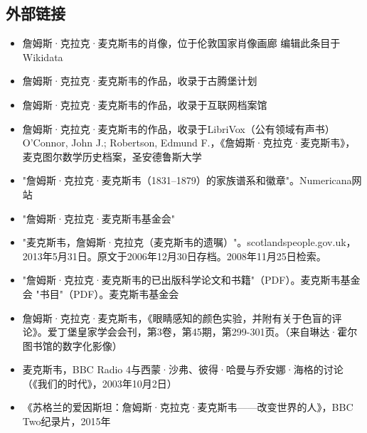 \subsection{外部链接}
\begin{itemize}
\item 詹姆斯·克拉克·麦克斯韦的肖像，位于伦敦国家肖像画廊 编辑此条目于Wikidata  
\item 詹姆斯·克拉克·麦克斯韦的作品，收录于古腾堡计划  
\item 詹姆斯·克拉克·麦克斯韦的作品，收录于互联网档案馆  
\item 詹姆斯·克拉克·麦克斯韦的作品，收录于LibriVox（公有领域有声书）  
O'Connor, John J.; Robertson, Edmund F.，《詹姆斯·克拉克·麦克斯韦》，麦克图尔数学历史档案，圣安德鲁斯大学  
\item "詹姆斯·克拉克·麦克斯韦（1831–1879）的家族谱系和徽章"。Numericana网站  
\item "詹姆斯·克拉克·麦克斯韦基金会"  
\item "麦克斯韦，詹姆斯·克拉克（麦克斯韦的遗嘱）"。scotlandspeople.gov.uk，2013年5月31日。原文于2006年12月30日存档。2008年11月25日检索。  
\item "詹姆斯·克拉克·麦克斯韦的已出版科学论文和书籍"（PDF）。麦克斯韦基金会  
"书目"（PDF）。麦克斯韦基金会  
\item 詹姆斯·克拉克·麦克斯韦，《眼睛感知的颜色实验，并附有关于色盲的评论》。爱丁堡皇家学会会刊，第3卷，第45期，第299-301页。（来自琳达·霍尔图书馆的数字化影像）  
\item 麦克斯韦，BBC Radio 4与西蒙·沙弗、彼得·哈曼与乔安娜·海格的讨论（《我们的时代》，2003年10月2日）  
\item 《苏格兰的爱因斯坦：詹姆斯·克拉克·麦克斯韦——改变世界的人》，BBC Two纪录片，2015年
\end{itemize}